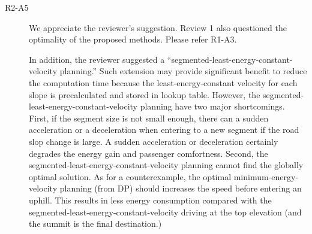 \documentclass[onecolumn]{IEEEconf}
\begin{document}
\begin{description}
\item [R2-A5] We appreciate the reviewer's suggestion. Review 1 also questioned the optimality of the proposed methods. Please  refer R1-A3. 

In addition, the reviewer suggested a ``segmented-least-energy-constant-velocity planning.'' Such extension may provide significant benefit to reduce the computation time because the least-energy-constant velocity for each slope is precalculated and stored in lookup table. 
However, the segmented-least-energy-constant-velocity planning have two major shortcomings. First, if the segment size is not small enough, there can a sudden acceleration or a deceleration when entering to a new segment if the road slop change is large. A sudden acceleration or deceleration certainly degrades the energy gain and passenger comfortness. Second, the segmented-least-energy-constant-velocity planning cannot find the globally optimal solution. As for a counterexample, the optimal minimum-energy-velocity planning (from DP) should increases  the speed before entering an uphill. This results in less energy consumption compared with the segmented-least-energy-constant-velocity driving at the top elevation (and the summit is the final destination.)  


\end{description}
\end{document}
